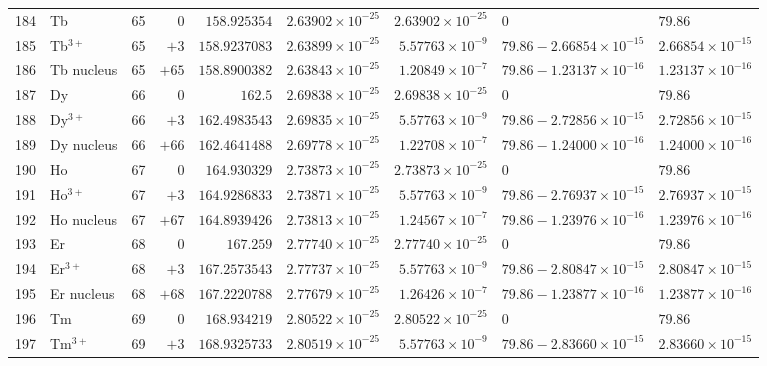 {\begin{tabular}{@{}r l r r r r r l l@{}}
184 & Tb & 65 & $0$ & $158.925354$ & $2.63902{\times}10^{-25}$ & $2.63902{\times}10^{-25}$ & $0$ & $79.86$ \\
185 & Tb$^{3+}$ & 65 & $+3$ & $158.9237083$ & $2.63899{\times}10^{-25}$ & $5.57763{\times}10^{-9}$ & $79.86 - 2.66854{\times}10^{-15}$ & $2.66854{\times}10^{-15}$ \\
186 & Tb nucleus & 65 & $+65$ & $158.8900382$ & $2.63843{\times}10^{-25}$ & $1.20849{\times}10^{-7}$ & $79.86 - 1.23137{\times}10^{-16}$ & $1.23137{\times}10^{-16}$ \\
187 & Dy & 66 & $0$ & $162.5$ & $2.69838{\times}10^{-25}$ & $2.69838{\times}10^{-25}$ & $0$ & $79.86$ \\
188 & Dy$^{3+}$ & 66 & $+3$ & $162.4983543$ & $2.69835{\times}10^{-25}$ & $5.57763{\times}10^{-9}$ & $79.86 - 2.72856{\times}10^{-15}$ & $2.72856{\times}10^{-15}$ \\
189 & Dy nucleus & 66 & $+66$ & $162.4641488$ & $2.69778{\times}10^{-25}$ & $1.22708{\times}10^{-7}$ & $79.86 - 1.24000{\times}10^{-16}$ & $1.24000{\times}10^{-16}$ \\
190 & Ho & 67 & $0$ & $164.930329$ & $2.73873{\times}10^{-25}$ & $2.73873{\times}10^{-25}$ & $0$ & $79.86$ \\
191 & Ho$^{3+}$ & 67 & $+3$ & $164.9286833$ & $2.73871{\times}10^{-25}$ & $5.57763{\times}10^{-9}$ & $79.86 - 2.76937{\times}10^{-15}$ & $2.76937{\times}10^{-15}$ \\
192 & Ho nucleus & 67 & $+67$ & $164.8939426$ & $2.73813{\times}10^{-25}$ & $1.24567{\times}10^{-7}$ & $79.86 - 1.23976{\times}10^{-16}$ & $1.23976{\times}10^{-16}$ \\
193 & Er & 68 & $0$ & $167.259$ & $2.77740{\times}10^{-25}$ & $2.77740{\times}10^{-25}$ & $0$ & $79.86$ \\
194 & Er$^{3+}$ & 68 & $+3$ & $167.2573543$ & $2.77737{\times}10^{-25}$ & $5.57763{\times}10^{-9}$ & $79.86 - 2.80847{\times}10^{-15}$ & $2.80847{\times}10^{-15}$ \\
195 & Er nucleus & 68 & $+68$ & $167.2220788$ & $2.77679{\times}10^{-25}$ & $1.26426{\times}10^{-7}$ & $79.86 - 1.23877{\times}10^{-16}$ & $1.23877{\times}10^{-16}$ \\
196 & Tm & 69 & $0$ & $168.934219$ & $2.80522{\times}10^{-25}$ & $2.80522{\times}10^{-25}$ & $0$ & $79.86$ \\
197 & Tm$^{3+}$ & 69 & $+3$ & $168.9325733$ & $2.80519{\times}10^{-25}$ & $5.57763{\times}10^{-9}$ & $79.86 - 2.83660{\times}10^{-15}$ & $2.83660{\times}10^{-15}$ \\

\end{tabular}}
